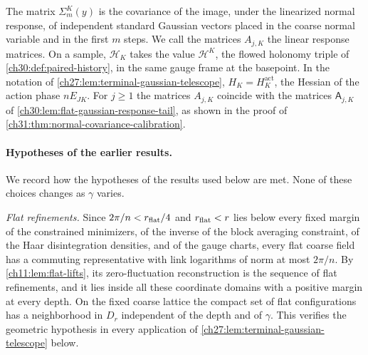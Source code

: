The matrix $\Sigma_m^K(y)$ is the covariance of the image, under the linearized normal response, of independent standard Gaussian vectors placed in the coarse normal variable and in the first $m$ steps. We call the matrices $A_{j,K}$ the linear response matrices. On a sample, $\mathscr H_K$ takes the value $\mathcal H^K$, the flowed holonomy triple of \cref{ch30:def:paired-history}, in the same gauge frame at the basepoint. In the notation of \cref{ch27:lem:terminal-gaussian-telescope}, $H_K=H_K^{\mathrm{act}}$, the Hessian of the action phase $nE_{JK}$. For $j\ge1$ the matrices $A_{j,K}$ coincide with the matrices $\mathsf A_{j,K}$ of \cref{ch30:lem:flat-gaussian-response-tail}, as shown in the proof of \cref{ch31:thm:normal-covariance-calibration}.

\paragraph{Hypotheses of the earlier results.}
We record how the hypotheses of the results used below are met. None of these choices changes as $\gamma$ varies.

\emph{Flat refinements.} Since $2\pi/n<r_{\rm flat}/4$ and $r_{\rm flat}<r$ lies below every fixed margin of the constrained minimizers, of the inverse of the block averaging constraint, of the Haar disintegration densities, and of the gauge charts, every flat coarse field has a commuting representative with link logarithms of norm at most $2\pi/n$. By \cref{ch11:lem:flat-lifts}, its zero-fluctuation reconstruction is the sequence of flat refinements, and it lies inside all these coordinate domains with a positive margin at every depth. On the fixed coarse lattice the compact set of flat configurations has a neighborhood in $D_r$ independent of the depth and of $\gamma$. This verifies the geometric hypothesis in every application of \cref{ch27:lem:terminal-gaussian-telescope} below.

